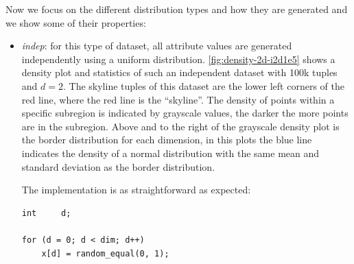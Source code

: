 \vfill
\pagebreak[4]

Now we focus on the different distribution types and how they are
generated and we show some of their properties:

\begin{itemize}
\item \emph{indep}: 
for this type of dataset, all attribute values are generated
independently using a uniform distribution. 
\autoref{fig:density-2d-i2d1e5} shows a density plot
and statistics of such an independent dataset with 100k tuples and $d
= 2$. The skyline tuples of this dataset are the lower left corners of
the red line, where the red line is the ``skyline''. The density of
points within a specific subregion is indicated by grayscale values,
the darker the more points are in the subregion. Above and to the
right of the grayscale density plot is the border distribution for
each dimension, in this plots the blue line indicates the density of a
normal distribution with the same mean and standard deviation as the
border distribution.

The implementation is as straightforward as expected:

\medskip
\begin{lstlisting}
int		d;

for (d = 0; d < dim; d++)
	x[d] = random_equal(0, 1);
\end{lstlisting}
\medskip


\end{itemize}
